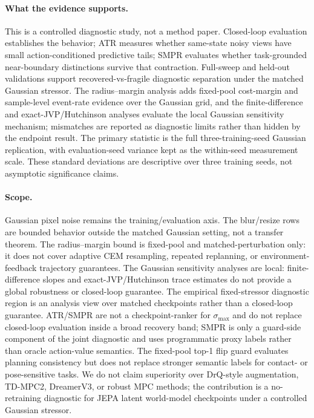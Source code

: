 \documentclass[10pt]{article}
\newcommand{\stdmax}{\ensuremath{\sigma_{\max}}}
\begin{document}
\paragraph{What the evidence supports.}
This is a controlled diagnostic study, not a method paper. Closed-loop evaluation establishes the behavior; ATR measures whether same-state noisy views have small action-conditioned predictive tails; SMPR evaluates whether task-grounded near-boundary distinctions survive that contraction. Full-sweep and held-out validations support recovered-vs-fragile diagnostic separation under the matched Gaussian stressor. The radius--margin analysis adds fixed-pool cost-margin and sample-level event-rate evidence over the Gaussian grid, and the finite-difference and exact-JVP/Hutchinson analyses evaluate the local Gaussian sensitivity mechanism; mismatches are reported as diagnostic limits rather than hidden by the endpoint result. The primary statistic is the full three-training-seed Gaussian replication, with evaluation-seed variance kept as the within-seed measurement scale. These standard deviations are descriptive over three training seeds, not asymptotic significance claims.

\paragraph{Scope.}
Gaussian pixel noise remains the training/evaluation axis. The blur/resize rows are bounded behavior outside the matched Gaussian setting, not a transfer theorem. The radius--margin bound is fixed-pool and matched-perturbation only: it does not cover adaptive CEM resampling, repeated replanning, or environment-feedback trajectory guarantees. The Gaussian sensitivity analyses are local: finite-difference slopes and exact-JVP/Hutchinson trace estimates do not provide a global robustness or closed-loop guarantee. The empirical fixed-stressor diagnostic region is an analysis view over matched checkpoints rather than a closed-loop guarantee. ATR/SMPR are not a checkpoint-ranker for \stdmax{} and do not replace closed-loop evaluation inside a broad recovery band; SMPR is only a guard-side component of the joint diagnostic and uses programmatic proxy labels rather than oracle action-value semantics. The fixed-pool top-1 flip guard evaluates planning consistency but does not replace stronger semantic labels for contact- or pose-sensitive tasks. We do not claim superiority over DrQ-style augmentation, TD-MPC2, DreamerV3, or robust MPC methods; the contribution is a no-retraining diagnostic for JEPA latent world-model checkpoints under a controlled Gaussian stressor.
\end{document}
